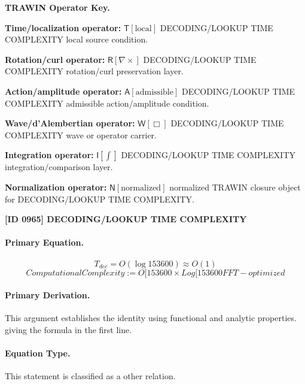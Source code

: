 \par\vspace{0.45\baselineskip}
\noindent\begin{minipage}[t]{\linewidth}
\begingroup
\small
\raggedright
\textbf{TRAWIN Operator Key.}\par
\noindent\textbf{Time/localization operator:} $\mathsf{T}\!\left[\mathrm{local}\right]$ DECODING/LOOKUP TIME COMPLEXITY local source condition.\par
\noindent\textbf{Rotation/curl operator:} $\mathsf{R}\!\left[\nabla\times\right]$ DECODING/LOOKUP TIME COMPLEXITY rotation/curl preservation layer.\par
\noindent\textbf{Action/amplitude operator:} $\mathsf{A}\!\left[\mathrm{admissible}\right]$ DECODING/LOOKUP TIME COMPLEXITY admissible action/amplitude condition.\par
\noindent\textbf{Wave/d'Alembertian operator:} $\mathsf{W}\!\left[\Box\right]$ DECODING/LOOKUP TIME COMPLEXITY wave or operator carrier.\par
\noindent\textbf{Integration operator:} $\mathsf{I}\!\left[\int\right]$ DECODING/LOOKUP TIME COMPLEXITY integration/comparison layer.\par
\noindent\textbf{Normalization operator:} $\mathsf{N}\!\left[\mathrm{normalized}\right]$ normalized TRAWIN closure object for DECODING/LOOKUP TIME COMPLEXITY.\par
\endgroup
\end{minipage}

\clearpage
\noindent\textbf{[ID 0965] DECODING/LOOKUP TIME COMPLEXITY}\par
\vspace{0.35em}
\paragraph{Primary Equation.}
\[
T_{dec} = O(\log 153600) \approx O(1)
\]
\[
ComputationalComplexity := O[153600 \times Log[153600 FFT-optimized
\]

\paragraph{Primary Derivation.}
This argument establishes the identity using functional and analytic properties. giving the formula in the first line.
\paragraph{Equation Type.}
This statement is classified as a other relation.

